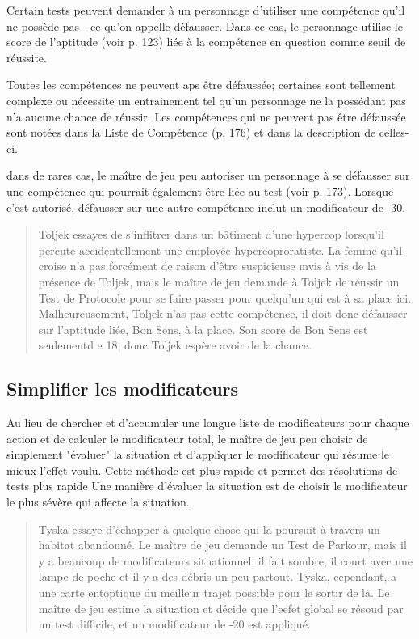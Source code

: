 Certain tests peuvent demander à un personnage d'utiliser une compétence qu'il ne possède pas - ce qu'on appelle défausser. Dans ce cas, le personnage utilise le score de l'aptitude (voir p. 123) liée à la compétence en question comme seuil de réussite. 

Toutes les compétences ne peuvent aps être défaussée; certaines sont tellement complexe ou nécessite un entrainement tel qu'un personnage ne la possédant pas n'a aucune chance de réussir. Les compétences qui ne peuvent pas être défaussée sont notées dans la Liste de Compétence (p. 176) et dans la description de celles-ci. 

dans de rares cas, le maître de jeu peu autoriser un personnage à se défausser sur une compétence qui pourrait également être liée au test (voir p. 173). Lorsque c'est autorisé, défausser sur une autre compétence inclut un modificateur de -30. 

\begin{quotation} Toljek essayes de s'inflitrer dans un bâtiment d'une hypercop lorsqu'il percute accidentellement une employée hypercoproratiste. La femme qu'il croise n'a pas forcément de raison d'être suspicieuse mvis à vis de la présence de Toljek, mais le maître de jeu demande à Toljek de réussir un Test de Protocole pour se faire passer pour quelqu'un qui est à sa place ici. Malheureusement, Toljek n'as pas cette compétence, il doit donc défausser sur l'aptitude liée, Bon Sens, à la place. Son score de Bon Sens est seulementd e 18, donc Toljek espère avoir de la chance. \end{quotation} 

\subsection{Simplifier les modificateurs} \label{sec:simpl-modif} 

Au lieu de chercher et d'accumuler une longue liste de modificateurs pour chaque action et de calculer le modificateur total, le maître de jeu peu choisir de simplement "évaluer" la situation et d'appliquer le modificateur qui résume le mieux l'effet voulu. Cette méthode est plus rapide et permet des résolutions de tests plus rapide Une manière d'évaluer la situation est de choisir le modificateur le plus sévère qui affecte la situation. 

\begin{quotation} Tyska essaye d'échapper à quelque chose qui la poursuit à travers un habitat abandonné. Le maître de jeu demande un Test de Parkour, mais il y a beaucoup de modificateurs situationnel: il fait sombre, il court avec une lampe de poche et il y a des débris un peu partout. Tyska, cependant, a une carte entoptique du meilleur trajet possible pour le sortir de là. Le maître de jeu estime la situation et décide que l'eefet global se résoud par un test difficile, et un modificateur de -20 est appliqué. \end{quotation} 

